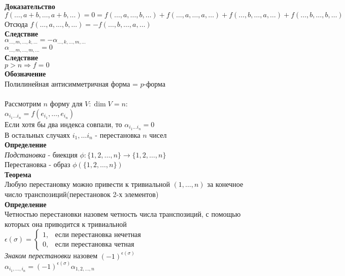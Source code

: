 \documentclass[12pt]{article}
\begin{document}
\textbf{Доказательство}\\
$f(\ldots, a+b, \ldots, a+b, \ldots) = 0 = f(\ldots, a, \ldots, b, \ldots) + f(\ldots, a, \ldots, a, \ldots) + f(\ldots, b, \ldots, a, \ldots) + f(\ldots, b, \ldots, b, \ldots)$\\
Отсюда $f(\ldots, a, \ldots, b, \ldots) = -f(\ldots, b, \ldots, a, \ldots)$\\
\textbf{Следствие}\\
$\alpha_{\ldots, m, \ldots, k, \ldots} = -\alpha_{\ldots, k, \ldots, m, \ldots}$\\
$\alpha_{\ldots, m, \ldots, m, \ldots} = 0$\\
\textbf{Следствие}\\
$p > n \Rightarrow f = 0$\\
\textbf{Обозначение}\\
Полилинейная антисимметричная форма = $p$-форма\\\\
Рассмотрим $n$ форму для $V: \dim V = n$:\\
$\alpha_{i_1\ldots i_n} = f(e_{i_1},\ldots,e_{i_n})$\\
Если хотя бы два индекса совпали, то $\alpha_{i_1\ldots i_n} = 0$\\
В остальных случаях $i_1, \ldots i_n$ - перестановка $n$ чисел\\
\textbf{Определение}\\
\textit{Подстановка} - биекция $\phi: \{1,2,\ldots, n\} \rightarrow \{1,2,\ldots, n\}$\\
Перестановка - образ $\phi(\{1,2,\ldots, n\})$\\
\textbf{Теорема}\\
Любую перестановку можно привести к тривиальной $(1,\ldots, n)$ за конечное число транспозиций(перестановок 2-х элементов)\\
\textbf{Определение}\\
Четностью перестановки назовем четность числа транспозиций, с помощью которых она приводится к тривиальной\\
$\epsilon(\sigma) = \left\{\begin{array}{ll}
     1,&\text{если перестановка нечетная}\\
     0,&\text{если перестановка четная}
\end{array}\right.$\\
\textit{Знаком перестановки} назовем $(-1)^{\epsilon(\sigma)}$\\
$\alpha_{i_1, \ldots, i_n} = (-1)^{\epsilon(\sigma)}\alpha_{1,2,\ldots, n}$\\
\end{document}
